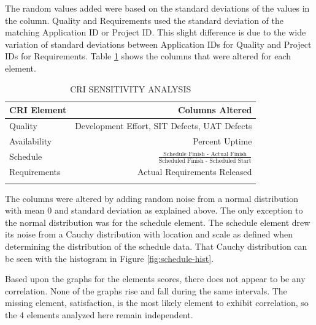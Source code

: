 \documentclass[SDSUThesis.tex]{subfiles}
\begin{document}
        The random values added were based on the standard 
        deviations of the values in the column.
        Quality and Requirements used the standard deviation of the
        matching Application ID or Project ID.  This slight difference
        is due to the wide variation of standard deviations between
        Application IDs for Quality and Project IDs for Requirements. 
        Table \ref{tab:sensitivity} shows the columns that were
        altered for each element.  
        
        \begin{longtable}{@{}l r}
            \toprule%
             \centering%
             {\bfseries CRI Element}
             & {\bfseries Columns Altered } \\
            
            \cmidrule[0.2pt](r{0.125em}){1-1}%
            \cmidrule[0.2pt](r{0.125em}){2-2}%
            \endhead
            
            Quality  & Development Effort, SIT Defects, UAT Defects \\
            \myrowcolour%
            Availability & Percent Uptime \\
            Schedule &  $\frac{\text{Schedule Finish - Actual Finish}}
                    {\text{Scheduled Finish - Scheduled Start}}$ \\
            \myrowcolour%
            Requirements & Actual Requirements Released \\
            
            \bottomrule
            
            \caption{CRI SENSITIVITY ANALYSIS}
            \label{tab:sensitivity}
        \end{longtable}
        
        The columns were altered by adding
        random noise from a normal distribution with mean 0 and standard
        deviation as explained above.  The only exception to the normal
        distribution was for the schedule element.  The schedule element
        drew its noise from a Cauchy distribution with location and scale
        as defined when determining the distribution of the schedule data.
        That Cauchy distribution can be seen with the histogram in 
        Figure \ref{fig:schedule-hist}. 
        
        
        Based upon the graphs for the elements scores, there does not
        appear to be any correlation.  None of the graphs
        rise and fall during the same intervals.  The missing element,
        satisfaction, is the most likely element to exhibit correlation,
        so the 4 elements analyzed here remain independent.
        
\end{document}
